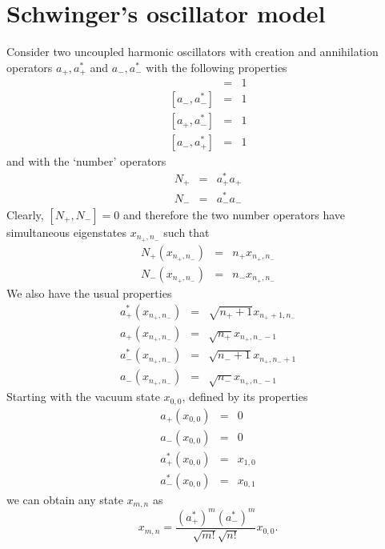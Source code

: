 \documentclass{article}
\numberwithin{equation}{section}
\theoremstyle{plain}
\numberwithin{thm}{section}
\theoremstyle{plain}
\numberwithin{prop}{section}
\theoremstyle{definition}
\numberwithin{defn}{section}
\theoremstyle{remark}
\begin{document}
\section{Schwinger's oscillator model}\label{s12}
Consider two uncoupled harmonic oscillators with creation and annihilation
operators $a_+, a_+^\ast$ and $a_-, a_-^\ast$ with the following properties
\begin{eqnarray}
[a_+, a_+^\ast] &=& 1 \label{s12e1} \\
{}[a_-, a_-^\ast] &=& 1 \label{s12e2} \\
{}[a_+, a_-^\ast] &=& 1 \label{s12e3} \\
{}[a_-, a_+^\ast] &=& 1 \label{s12e4} 
\end{eqnarray}
and with the `number' operators
\begin{eqnarray}
N_+ &=& a_+^\ast a_+ \label{s12e5} \\
N_- &=& a_-^\ast a_- \label{s12e6}
\end{eqnarray}
Clearly, $[N_+, N_-] = 0$ and therefore the two number operators have 
simultaneous eigenstates $x_{n_+,n_-}$ such that
\begin{eqnarray}
N_+(x_{n_+,n_-}) &=& n_+x_{n_+,n_-} \label{s12e7} \\
N_-(x_{n_+,n_-}) &=& n_-x_{n_+,n_-} \label{s12e8} 
\end{eqnarray}
We also have the usual properties
\begin{eqnarray}
a_+^\ast(x_{n_+, n_-}) &=& \sqrt{n_+ + 1} x_{n_+ + 1, n_-} \label{s12e9} \\
a_+(x_{n_+, n_-}) &=& \sqrt{n_+} x_{n_+, n_- - 1} \label{s12e10} \\
a_-^\ast(x_{n_+, n_-}) &=& \sqrt{n_- + 1} x_{n_+, n_- + 1} \label{s12e11} \\
a_-(x_{n_+, n_-}) &=& \sqrt{n_-} x_{n_+, n_- - 1} \label{s12e12}
\end{eqnarray}
Starting with the vacuum state $x_{0,0}$, defined by its properties
\begin{eqnarray}
a_+(x_{0,0}) &=& 0 \label{s12e13} \\
a_-(x_{0,0}) &=& 0 \label{s12e14} \\
a_+^\ast(x_{0,0}) &=& x_{1,0} \label{s12e15} \\
a_-^\ast(x_{0,0}) &=& x_{0,1} \label{s12e16}
\end{eqnarray}
we can obtain any state $x_{m,n}$ as
\begin{equation}\label{s12e17}
x_{m,n} = \frac{(a_+^\ast)^m (a_-^\ast)^m}{\sqrt{m!}\sqrt{n!}} x_{0,0}.
\end{equation}
\end{document}
